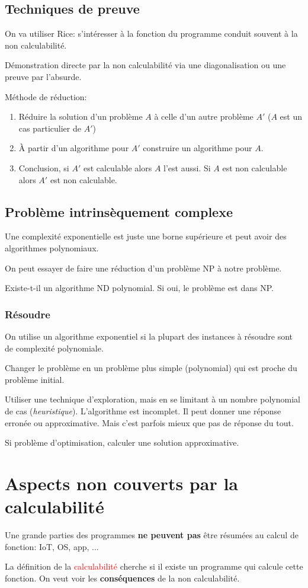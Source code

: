 \documentclass{report}
\begin{document}
\subsection{Techniques de preuve}
On va utiliser Rice: s'intéresser à la fonction du programme conduit souvent à la non calculabilité.\par 
Démonstration directe par la non calculabilité via une diagonalisation ou une preuve par l'absurde.\par 
Méthode de réduction:
\begin{enumerate}
	\item Réduire la solution d'un problème $A$ à celle d'un autre problème $A'$ ($A$ est un cas particulier de $A'$)
	\item À partir d'un algorithme pour $A'$ construire un algorithme pour $A$.
	\item Conclusion, si $A'$ est calculable alors $A$ l'est aussi. Si $A$ est non calculable alors $A'$ est non calculable.
\end{enumerate}

\subsection{Problème intrinsèquement complexe}
Une complexité exponentielle est juste une borne supérieure et peut avoir des algorithmes polynomiaux.\par 
On peut essayer de faire une réduction d'un problème NP à notre problème.\par 
Existe-t-il un algorithme ND polynomial. Si oui, le problème est dans NP.

\subsubsection{Résoudre}
On utilise un algorithme exponentiel si la plupart des instances à résoudre sont de complexité polynomiale.\par 
Changer le problème en un problème plus simple (polynomial) qui est proche du problème initial.\par 
Utiliser une technique d'exploration, mais en se limitant à un nombre polynomial de cas (\textit{heuristique}). L'algorithme est incomplet. Il peut donner une réponse erronée ou approximative. Mais c'est parfois mieux que pas de réponse du tout.\par 
Si problème d'optimisation, calculer une solution approximative.

\section{Aspects non couverts par la calculabilité}
Une grande parties des programmes \textbf{ne peuvent pas} être résumées au calcul de fonction: IoT, OS, app, ...\par
La définition de la \textcolor{red}{calculabilité} cherche si il existe un programme qui calcule cette fonction. On veut voir les \textbf{conséquences} de la non calculabilité.
\end{document}
